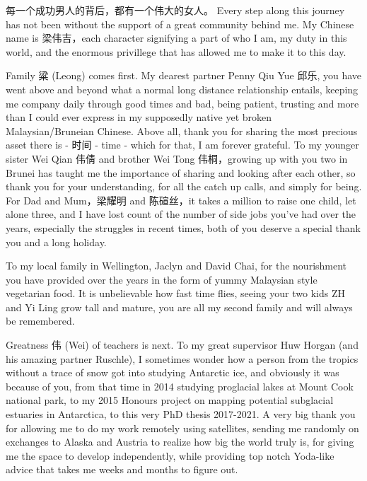 \documentclass[12pt,twoside]{book}
\begin{document}
\begin{CJK*}{UTF8}{gbsn}
每一个成功男人的背后，都有一个伟大的女人。
Every step along this journey has not been without the support of a great community behind me.
My Chinese name is 梁伟吉，each character signifying a part of who I am, my duty in this world, and the enormous privillege that has allowed me to make it to this day.

Family 粱 (Leong) comes first.
My dearest partner Penny Qiu Yue 邱乐, you have went above and beyond what a normal long distance relationship entails, keeping me company daily through good times and bad, being patient, trusting and more than I could ever express in my supposedly native yet broken Malaysian/Bruneian Chinese.
Above all, thank you for sharing the most precious asset there is - 时间 - time - which for that, I am forever grateful.
To my younger sister Wei Qian 伟倩 and brother Wei Tong 伟桐，growing up with you two in Brunei has taught me the importance of sharing and looking after each other, so thank you for your understanding, for all the catch up calls, and simply for being.
For Dad and Mum，梁耀明 and 陈碹丝，it takes a million to raise one child, let alone three, and I have lost count of the number of side jobs you've had over the years, especially the struggles in recent times, both of you deserve a special thank you and a long holiday.

To my local family in Wellington, Jaclyn and David Chai, for the nourishment you have provided over the years in the form of yummy Malaysian style vegetarian food.
It is unbelievable how fast time flies, seeing your two kids ZH and Yi Ling grow tall and mature, you are all my second family and will always be remembered.

Greatness 伟 (Wei) of teachers is next.
To my great supervisor Huw Horgan (and his amazing partner Ruschle), I sometimes wonder how a person from the tropics without a trace of snow got into studying Antarctic ice, and obviously it was because of you, from that time in 2014 studying proglacial lakes at Mount Cook national park, to my 2015 Honours project on mapping potential subglacial estuaries in Antarctica, to this very PhD thesis 2017-2021.
A very big thank you for allowing me to do my work remotely using satellites, sending me randomly on exchanges to Alaska and Austria to realize how big the world truly is, for giving me the space to develop independently, while providing top notch Yoda-like advice that takes me weeks and months to figure out.


\end{CJK*}
\end{document}
